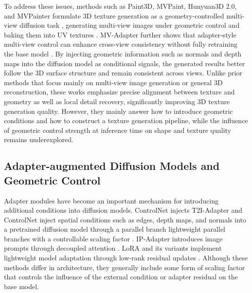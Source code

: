 \documentclass[times,twocolumn,final]{elsarticle}
\providecommand{\DIFadd}[1]{{\protect\color{blue} \sf #1}} %
\providecommand{\DIFdel}[1]{{\protect\color{red} \scriptsize #1}} %
\providecommand{\DIFaddbegin}{} %
\providecommand{\DIFaddend}{} %
\providecommand{\DIFdelbegin}{} %
\providecommand{\DIFdelend}{} %
\newcommand{\DIFscaledelfig}{0.5}
\newlength{\DIFdelgraphicswidth} %
\newlength{\DIFdelgraphicsheight} %
\newcommand{\DIFaddincludegraphics}[2][]{{\color{blue}\fbox{\DIFOincludegraphics[#1]{#2}}}} %
\newcommand{\DIFdelincludegraphics}[2][]{%
\sbox{\DIFdelgraphicsbox}{\DIFOincludegraphics[#1]{#2}}%
\settoboxwidth{\DIFdelgraphicswidth}{\DIFdelgraphicsbox} %
\settoboxtotalheight{\DIFdelgraphicsheight}{\DIFdelgraphicsbox} %
\scalebox{\DIFscaledelfig}{%
\parbox[b]{\DIFdelgraphicswidth}{\usebox{\DIFdelgraphicsbox}\\[-\baselineskip] \rule{\DIFdelgraphicswidth}{0em}}\llap{\resizebox{\DIFdelgraphicswidth}{\DIFdelgraphicsheight}{%
\setlength{\unitlength}{\DIFdelgraphicswidth}%
\begin{picture}(1,1)%
\thicklines\linethickness{2pt} %
{\color[rgb]{1,0,0}\put(0,0){\framebox(1,1){}}}%
{\color[rgb]{1,0,0}\put(0,0){\line( 1,1){1}}}%
{\color[rgb]{1,0,0}\put(0,1){\line(1,-1){1}}}%
\end{picture}%
}\hspace*{3pt}}} %
} %
\DeclareRobustCommand{\DIFaddbegin}{\DIFOaddbegin \let\includegraphics\DIFaddincludegraphics} %
\DeclareRobustCommand{\DIFaddend}{\DIFOaddend \let\includegraphics\DIFOincludegraphics} %
\DeclareRobustCommand{\DIFdelbegin}{\DIFOdelbegin \let\includegraphics\DIFdelincludegraphics} %
\DeclareRobustCommand{\DIFdelend}{\DIFOaddend \let\includegraphics\DIFOincludegraphics} %
\begin{document}
To address these issues, methods such as \DIFaddbegin \DIFadd{Paint3D, MVPaint, Hunyuan3D 2.0, and }\DIFaddend MVPainter formulate 3D texture generation as a geometry-controlled multi-view diffusion task\DIFdelbegin \DIFdel{\cite{shao2025mvpainter}}\DIFdelend \DIFaddbegin \DIFadd{, generating multi-view images under geometric control and baking them into UV textures \cite{zeng2024paint3d,cheng2024mvpaint,lai2025hunyuan3d,shao2025mvpainter}}\DIFaddend . MV-Adapter further shows that adapter-style multi-view control can enhance cross-view consistency without fully retraining the base model \cite{huang2024mvadapter}. By injecting geometric information such as normals and depth maps into the diffusion model as conditional signals, the generated results better follow the 3D surface structure and remain consistent across views. Unlike prior methods that focus mainly on multi-view image generation or general 3D reconstruction, these works emphasize precise alignment between texture and geometry as well as local detail recovery, significantly improving 3D texture generation quality. However, they mainly answer how to introduce geometric conditions and how to construct a texture generation pipeline, while the influence of geometric control strength at inference time on shape and texture quality remains underexplored.

\subsection{Adapter-augmented Diffusion Models and Geometric Control}
\label{subsec:adapter}

Adapter modules have become an important mechanism for introducing additional conditions into diffusion models. \DIFdelbegin \DIFdel{ControlNet injects }\DIFdelend \DIFaddbegin \DIFadd{T2I-Adapter and ControlNet inject }\DIFaddend spatial conditions such as edges, depth maps, and normals into a pretrained diffusion model through \DIFdelbegin \DIFdel{a parallel branch \cite{zhang2023controlnet}}\DIFdelend \DIFaddbegin \DIFadd{lightweight parallel branches with a controllable scaling factor \cite{mou2023t2iadapter,zhang2023controlnet}}\DIFaddend . IP-Adapter introduces image prompts through decoupled attention \cite{ye2023ipadapter}. LoRA and its variants implement lightweight model adaptation through low-rank residual updates \cite{hu2022lora,liu2024dora,zhang2023adalora}. Although these methods differ in architecture, they generally include some form of scaling factor that controls the influence of the external condition or adapter residual on the base model.
\end{document}

